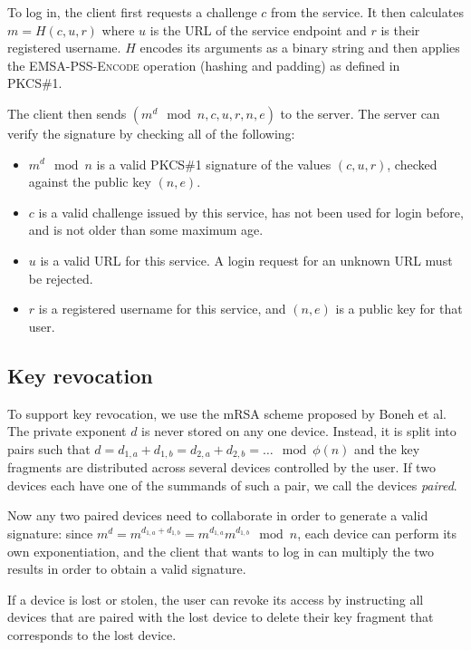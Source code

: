 \documentclass{acm_proc_article-sp}
\begin{document}
To log in, the client first requests a challenge $c$ from the service. It then calculates
$m = H(c, u, r)$ where $u$ is the URL of the service endpoint and $r$ is their registered username.
$H$ encodes its arguments as a binary string and then applies the \textsc{EMSA-PSS-Encode} operation
(hashing and padding) as defined in PKCS\#1.~\cite{PKCS1}

The client then sends $(m^d \mod n, c, u, r, n, e)$ to the server. The server can verify the
signature by checking all of the following:

\begin{itemize}
\item $m^d \mod n$ is a valid PKCS\#1 signature of the values $(c, u, r)$, checked against the
public key $(n, e)$.
\item $c$ is a valid challenge issued by this service, has not been used for login before, and is
not older than some maximum age.
\item $u$ is a valid URL for this service. A login request for an unknown URL must be rejected.
\item $r$ is a registered username for this service, and $(n, e)$ is a public key for that user.
\end{itemize}

\subsection{Key revocation}

To support key revocation, we use the mRSA scheme proposed by Boneh et al.~\cite{Boneh01} The
private exponent $d$ is never stored on any one device. Instead, it is split into pairs such that
$d = d_{1,a} + d_{1,b} = d_{2,a} + d_{2,b} = \dots \mod \phi(n)$ and the key fragments are
distributed across several devices controlled by the user. If two devices each have one of the
summands of such a pair, we call the devices \emph{paired}.

Now any two paired devices need to collaborate in order to generate a valid signature: since
$m^d = m^{d_{1,a} + d_{1,b}} = m^{d_{1,a}} m^{d_{1,b}} \mod n$, each device can perform its own
exponentiation, and the client that wants to log in can multiply the two results in order to obtain
a valid signature.

If a device is lost or stolen, the user can revoke its access by instructing all devices that are
paired with the lost device to delete their key fragment that corresponds to the lost device.
\end{document}
